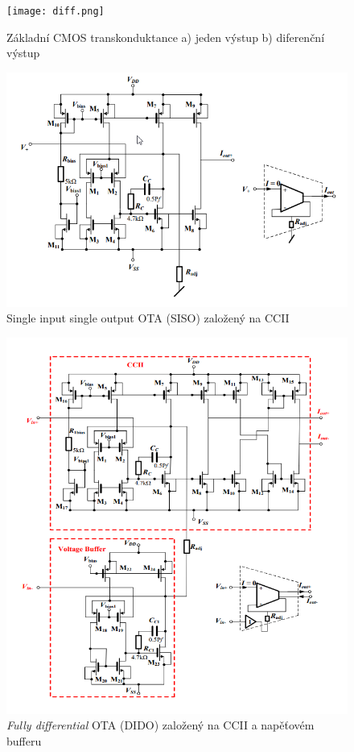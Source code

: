 \begin{figure}[h]
\centering
\texttt{[image: diff.png]}
\caption[Základní CMOS transkonduktance a) jeden výstup b) diferenční výstup]{Základní CMOS transkonduktance a) jeden výstup b) diferenční výstup \cite{12} \label{s:CMOS}}
\end{figure}
\begin{figure}[h]
\centering
\includegraphics[scale=0.6]{siso.png}
\caption[Single input single output OTA (SISO) založený na CCII]{Single input single output OTA (SISO) založený na CCII \cite{8}}
\end{figure}
\begin{figure}[h]
\centering
\includegraphics[scale=0.5]{dido.png}
\caption[\textit{Fully differential} OTA (DIDO) založený na CCII a napěťovém bufferu]{\textit{Fully differential} OTA (DIDO) založený na CCII a napěťovém bufferu \cite{8}}
\end{figure}
\newpage
